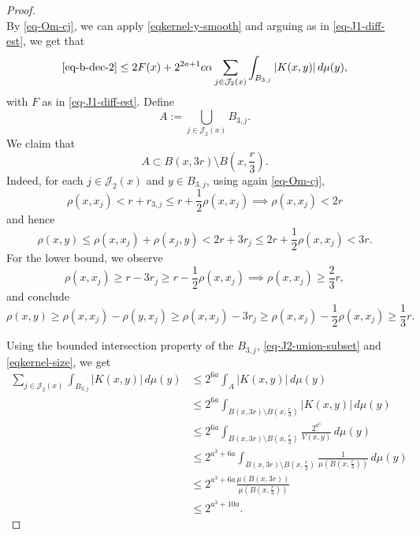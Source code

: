 \documentclass[10pt,a4paper]{article}
\theoremstyle{plain}
\theoremstyle{definition}
\numberwithin{equation}{subsection}
\begin{document}
\begin{proof}
\begin{equation}
\end{equation}
By \eqref{eq-Om-cj}, we can apply \eqref{eqkernel-y-smooth} and arguing as in \eqref{eq-J1-diff-est}, we get that
\begin{equation}
    \label{eq-J2-diff-est-2}
    \eqref{eq-b-dec-2} \le 2F(x) + 2^{2a+1}c\alpha \sum_{j\in\mathcal{J}_2(x)} \int_{B_{3,j}}  |K(x,y)|\,d\mu(y),
\end{equation}
with $F$ as in \eqref{eq-J1-diff-est}.
Define
\begin{equation*}
    A := \bigcup_{j \in \mathcal{J}_2(x)} B_{3,j}.
\end{equation*}
We claim that
\begin{equation}
    \label{eq-J2-union-subset}
    A\subset B(x,3r) \setminus B(x,\frac{r}{3}).
\end{equation}
Indeed, for each $j\in \mathcal{J}_2(x)$ and $y\in B_{3,j}$, using again \eqref{eq-Om-cj},
\begin{equation*}
    \rho(x,x_j) < r+r_{3,j} \le r + \frac{1}{2} \rho(x,x_j) \implies \rho(x,x_j) < 2r
\end{equation*}
and hence
\begin{equation*}
    \rho(x,y) \le \rho(x,x_j) + \rho(x_j,y) < 2r + 3r_j \le 2r + \frac{1}{2}\rho(x,x_j) < 3r.
\end{equation*}
For the lower bound, we observe
\begin{equation*}
    \rho(x,x_j) \ge r-3r_j \ge r - \frac{1}{2} \rho(x,x_j) \implies \rho(x,x_j) \ge \frac{2}{3}r,
\end{equation*}
and conclude
\begin{equation*}
    \rho(x,y) \ge \rho(x,x_j) - \rho(y,x_j) \ge \rho(x,x_j) - 3r_j \ge \rho(x,x_j) - \frac{1}{2}\rho(x,x_j) \ge \frac{1}{3} r.
\end{equation*}

Using the bounded intersection property of the $B_{3,j}$, \eqref{eq-J2-union-subset} and \eqref{eqkernel-size}, we get
\begin{align}
    \sum_{j\in\mathcal{J}_2(x)} \int_{B_{3,j}}  |K(x,y)|\,d\mu(y) &\le 2^{6a} \int_{A}  |K(x,y)|\,d\mu(y) \\
    &\le 2^{6a} \int_{B(x,3r) \setminus B(x,\frac{r}{3})}  |K(x,y)|\,d\mu(y) \\
    &\le 2^{6a} \int_{B(x,3r) \setminus B(x,\frac{r}{3})} \frac{2^{a^3}}{V(x,y)} \,d\mu(y) \\
    &\le 2^{a^3+6a} \int_{B(x,3r) \setminus B(x,\frac{r}{3})} \frac{1}{\mu(B(x,\frac{r}{3}))} \,d\mu(y) \\
    &\le 2^{a^3+6a} \frac{\mu(B(x,3r))}{\mu(B(x,\frac{r}{3}))} \\
    \label{eq-J2-diff-est-4}
    &\le 2^{a^3+10a}.
\end{align}


\end{proof}
\end{document}
